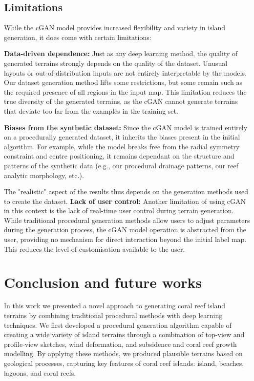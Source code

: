 \subsection{Limitations}
\label{sec:coral-island-limitations}

While the cGAN model provides increased flexibility and variety in island generation, it does come with certain limitations:

\begin{Itemize}
    \Item{} \textbf{Data-driven dependence:} Just as any deep learning method, the quality of generated terrains strongly depends on the quality of the dataset. Unusual layouts or out-of-distribution inputs are not entirely interpretable by the models. Our dataset generation method lifts some restrictions, but some remain such as the required presence of all regions in the input map. This limitation reduces the true diversity of the generated terrains, as the cGAN cannot generate terrains that deviate too far from the examples in the training set.
    
    \Item{} \textbf{Biases from the synthetic dataset:} Since the cGAN model is trained entirely on a procedurally generated dataset, it inherits the biases present in the initial algorithm. For example, while the model breaks free from the radial symmetry constraint and centre positioning, it remains dependant on the structure and patterns of the synthetic data (e.g., our procedural drainage patterns, our reef analytic morphology, etc.).
    
    The "realistic" aspect of the results thus depends on the generation methods used to create the dataset.
    \Item{} \textbf{Lack of user control:} Another limitation of using cGAN in this context is the lack of real-time user control during terrain generation. While traditional procedural generation methods allow users to adjust parameters during the generation process, the cGAN model operation is abstracted from the user, providing no mechanism for direct interaction beyond the initial label map. This reduces the level of customisation available to the user.
\end{Itemize}

\section{Conclusion and future works}
\label{sec:coral-island-conclusion}

In this work we presented a novel approach to generating coral reef island terrains by combining traditional procedural methods with deep learning techniques. We first developed a procedural generation algorithm capable of creating a wide variety of island terrains through a combination of top-view and profile-view sketches, wind deformation, and subsidence and coral reef growth modelling. By applying these methods, we produced plausible terrains based on geological processes, capturing key features of coral reef islands: island, beaches, lagoons, and coral reefs.

